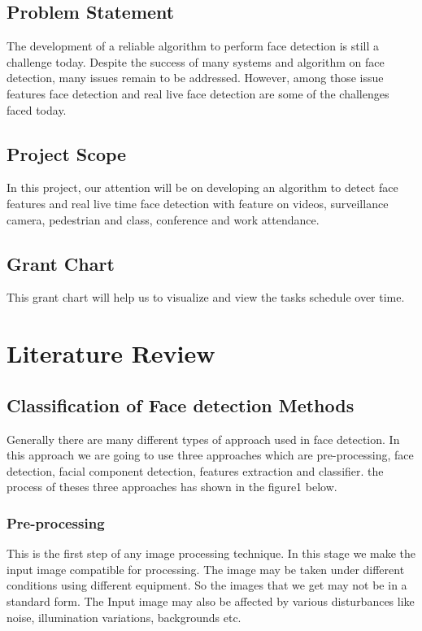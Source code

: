 \documentclass[12pt]{report}
\begin{document}
 
\section{Problem Statement}                 
The development of a reliable algorithm to perform face detection is still a challenge today. Despite the success of many systems and algorithm on face detection, many issues remain to be addressed. However, among those issue features face detection and real live face detection are some of the challenges faced today. 

 
\section{Project Scope}     
            
In this project, our attention will be on developing an algorithm to detect face features and real live time face detection with feature on videos, surveillance camera, pedestrian and class, conference and work attendance. 

\section{Grant Chart}     

This grant chart will help us to visualize and view the tasks schedule over time.

\chapter{Literature Review}               
                
\section{Classification of Face detection Methods}                 
Generally there are many different types of approach used in face detection. In this approach we are going to use three approaches which are pre-processing, face detection, facial component detection, features extraction and classifier. the process of theses three approaches has shown in the figure1 below. 
\subsection{Pre-processing}

This is the first step of any image processing technique. In this stage we make the input image compatible for processing. The image may be taken under different conditions using different equipment. So the images that we get may not be in a standard form. The Input image may also be affected by various disturbances like noise, illumination variations, backgrounds etc.
\end{document}
